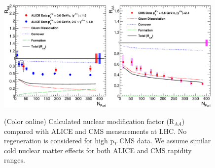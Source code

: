 \documentclass[aps,prc,preprint,superscriptaddress,showpacs,showkeys]{revtex4-1}
\begin{document}
\begin{figure}
\includegraphics[width=0.49\textwidth]{Figures/Fig6a_ALICE_RAANPart.eps}
\includegraphics[width=0.49\textwidth]{Figures/Fig6b_CMS_RAANPart.eps}
\caption{(Color online) Calculated nuclear modification factor (R$_{AA}$) compared with ALICE and CMS measurements at LHC. No regeneration is 
considered for high p$_{T}$ CMS data. We assume similar cold nuclear matter effects for both ALICE and CMS rapidity ranges.}
\label{fig:JPsiRaa}
\end{figure}
\end{document}
